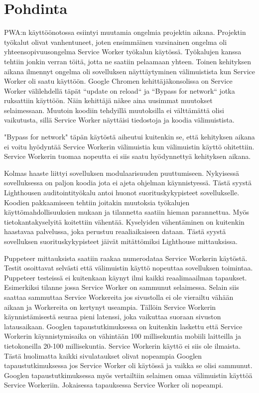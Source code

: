 \documentclass{tktltiki}
\begin{document}
\clearpage
\section{Pohdinta}

PWA:n käyttöönotossa esiintyi muutamia ongelmia projektin aikana. Projektin työkalut olivat vanhentuneet, joten ensimmäinen varsinainen ongelma oli yhteensopivuusongelma Service Worker työkalun käytössä. Työkalujen kanssa tehtiin jonkin verran töitä, jotta ne saatiin pelaamaan yhteen. Toinen kehityksen aikana ilmennyt ongelma oli sovelluksen näyttäytyminen välimuistista kun Service Worker oli saatu käyttöön. Google Chromen kehittäjäkonsolissa on Service Worker välilehdellä täpät “update on reload“ ja “Bypass for network“ jotka ruksattiin käyttöön. Näin kehittäjä näkee aina uusimmat muutokset selaimessaan. Muutoin koodiin tehdyillä muutoksilla ei välttämättä olisi vaikutusta, sillä Service Worker näyttäisi tiedostoja ja koodia välimuistista. 

"Bypass for network" täpän käytöstä aiheutui kuitenkin se, että kehityksen aikana ei voitu hyödyntää Service Workerin välimuistia kun välimuistin käyttö ohitettiin. Service Workerin tuomaa nopeutta ei siis saatu hyödynnettyä kehityksen aikana.

Kolmas haaste liittyi sovelluksen modulaarisuuden puuttumiseen. Nykyisessä sovelluksessa on paljon koodia jota ei ajeta ohjelman käynnistyessä. Tästä syystä Lighthousen auditointityökalu antoi huonot suorituskykypisteet sovellukselle. Koodien pakkaamiseen tehtiin joitakin muutoksia työkalujen käyttömahdollisuuksien mukaan ja tilannetta saatiin hieman parannettua. Myös tietokantakyselyitä koitettiin vähentää. Kyselyiden vähentäminen on kuitenkin haastavaa palvelussa, joka perustuu reaaliaikaiseen dataan. Tästä syystä sovelluksen suorituskykypisteet jäivät mitättömiksi Lighthouse mittauksissa. 

Puppeteer mittauksista saatiin raakaa numerodataa Service Workerin käytöstä. Testit osoittavat selvästi että välimuistin käyttö nopeuttaa sovelluksen toimintaa. Puppeteer testeissä ei kuitenkaan käynyt ilmi kaikki reaalimaailman tapaukset. Esimerkiksi tilanne jossa Service Worker on sammunut selaimessa. Selain siis saattaa sammuttaa Service Workereita jos sivustolla ei ole vierailtu vähään aikaan ja Workereita on kertynyt useampia. Tällöin Service Workerin käynnistämisestä seuraa pieni latenssi, joka vaikuttaa suoraan sivuston latausaikaan. Googlen tapaustutkimuksessa on kuitenkin laskettu että Service Workerin käynnistymisaika on vähintään 100 millisekuntia mobiili laitteilla ja tietokoneilla 20-100 millisekuntia. Service Workerin käyttö ei siis ole ilmaista. Tästä huolimatta kaikki sivulataukset olivat nopeampia Googlen tapaustutkimuksessa jos Service Worker oli käytössä ja vaikka se olisi sammunut. Googlen tapaustutkimuksessa myös vertailtiin selaimen omaa välimuistin käyttöä Service Workeriin. Jokaisessa tapauksessa Service Worker oli nopeampi. 
\end{document}
